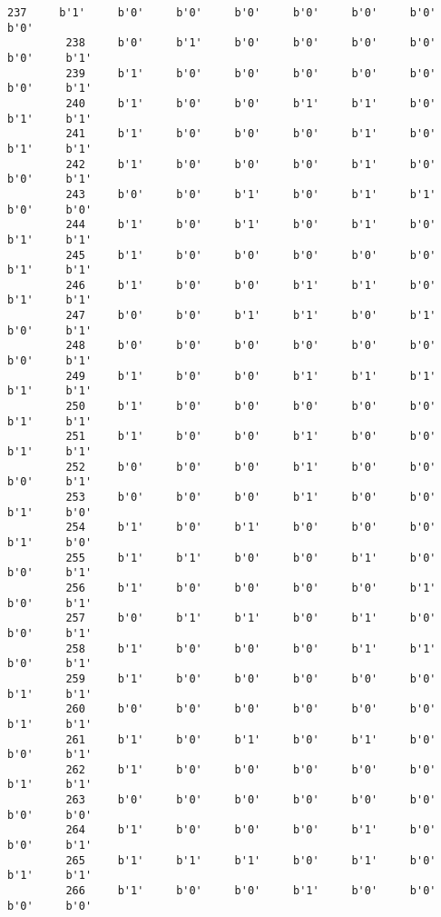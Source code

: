 \documentclass[11pt]{article}
\begin{document}
\begin{Verbatim}[commandchars=\\\{\}]
         237     b'1'     b'0'     b'0'     b'0'     b'0'     b'0'     b'0'     b'0'   
         238     b'0'     b'1'     b'0'     b'0'     b'0'     b'0'     b'0'     b'1'   
         239     b'1'     b'0'     b'0'     b'0'     b'0'     b'0'     b'0'     b'1'   
         240     b'1'     b'0'     b'0'     b'1'     b'1'     b'0'     b'1'     b'1'   
         241     b'1'     b'0'     b'0'     b'0'     b'1'     b'0'     b'1'     b'1'   
         242     b'1'     b'0'     b'0'     b'0'     b'1'     b'0'     b'0'     b'1'   
         243     b'0'     b'0'     b'1'     b'0'     b'1'     b'1'     b'0'     b'0'   
         244     b'1'     b'0'     b'1'     b'0'     b'1'     b'0'     b'1'     b'1'   
         245     b'1'     b'0'     b'0'     b'0'     b'0'     b'0'     b'1'     b'1'   
         246     b'1'     b'0'     b'0'     b'1'     b'1'     b'0'     b'1'     b'1'   
         247     b'0'     b'0'     b'1'     b'1'     b'0'     b'1'     b'0'     b'1'   
         248     b'0'     b'0'     b'0'     b'0'     b'0'     b'0'     b'0'     b'1'   
         249     b'1'     b'0'     b'0'     b'1'     b'1'     b'1'     b'1'     b'1'   
         250     b'1'     b'0'     b'0'     b'0'     b'0'     b'0'     b'1'     b'1'   
         251     b'1'     b'0'     b'0'     b'1'     b'0'     b'0'     b'1'     b'1'   
         252     b'0'     b'0'     b'0'     b'1'     b'0'     b'0'     b'0'     b'1'   
         253     b'0'     b'0'     b'0'     b'1'     b'0'     b'0'     b'1'     b'0'   
         254     b'1'     b'0'     b'1'     b'0'     b'0'     b'0'     b'1'     b'0'   
         255     b'1'     b'1'     b'0'     b'0'     b'1'     b'0'     b'0'     b'1'   
         256     b'1'     b'0'     b'0'     b'0'     b'0'     b'1'     b'0'     b'1'   
         257     b'0'     b'1'     b'1'     b'0'     b'1'     b'0'     b'0'     b'1'   
         258     b'1'     b'0'     b'0'     b'0'     b'1'     b'1'     b'0'     b'1'   
         259     b'1'     b'0'     b'0'     b'0'     b'0'     b'0'     b'1'     b'1'   
         260     b'0'     b'0'     b'0'     b'0'     b'0'     b'0'     b'1'     b'1'   
         261     b'1'     b'0'     b'1'     b'0'     b'1'     b'0'     b'0'     b'1'   
         262     b'1'     b'0'     b'0'     b'0'     b'0'     b'0'     b'1'     b'1'   
         263     b'0'     b'0'     b'0'     b'0'     b'0'     b'0'     b'0'     b'0'   
         264     b'1'     b'0'     b'0'     b'0'     b'1'     b'0'     b'0'     b'1'   
         265     b'1'     b'1'     b'1'     b'0'     b'1'     b'0'     b'1'     b'1'   
         266     b'1'     b'0'     b'0'     b'1'     b'0'     b'0'     b'0'     b'0'   

\end{Verbatim}
\end{document}
